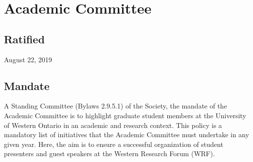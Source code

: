 \section{Academic Committee}

\subsection{Ratified}
August 22, 2019

\subsection{Mandate}
A Standing Committee (Bylaws 2.9.5.1) of the Society, the mandate of the Academic Committee is to highlight graduate student members at the University of Western Ontario in an academic and research context. This policy is a mandatory list of initiatives that the Academic Committee must undertake in any given year. Here, the aim is to ensure a successful organization of student presenters and guest speakers at the Western Research Forum (WRF).

